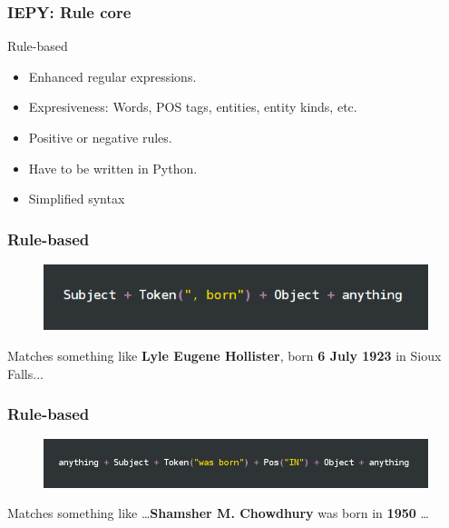 \documentclass{beamer}
\begin{document}


\begin{frame}
\frametitle{IEPY: Rule core}

\begin{block}{Rule-based}
\begin{itemize}
 \item Enhanced regular expressions.
 \item Expresiveness: Words, POS tags, entities, entity kinds, etc.
 \item Positive or negative rules.
 \item Have to be written in Python.
 \item Simplified syntax
\end{itemize}
\end{block}

\end{frame}


\begin{frame}
\frametitle{Rule-based}

\begin{figure}
\includegraphics[scale=0.5]{rule1}
\end{figure}

\pause

\begin{block}{Matches something like}
\vspace{15pt}
{\bf Lyle Eugene Hollister}, born {\bf 6 July 1923} in Sioux Falls...
\vspace{15pt}
\end{block}

\end{frame}


\begin{frame}
\frametitle{Rule-based}

\begin{figure}
\includegraphics[width=1\linewidth]{rule2}
\end{figure}

\pause

\begin{block}{Matches something like}
\vspace{15pt}
\dots {\bf Shamsher M. Chowdhury} was born in {\bf 1950} \dots
\vspace{15pt}
\end{block}

\end{frame}
\end{document}
